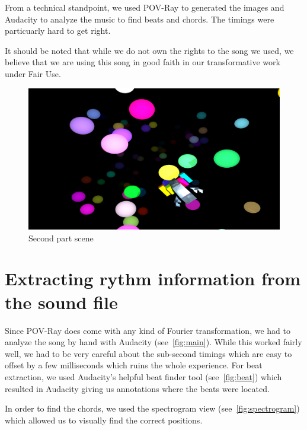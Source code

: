 \documentclass[a4paper, 12pt]{scrartcl}
\begin{document}
    From a technical standpoint, we used POV-Ray to generated the images and Audacity to analyze
    the music to find beats and chords. The timings were particuarly hard to get right.

    It should be noted that while we do not own the rights to the song we used, we believe that we
    are using this song in good faith in our transformative work under Fair Use.

    \begin{figure}[H]
        \centering
        \includegraphics[scale=0.23]{render_part2}
        \caption{Second part scene}
        \label{fig:part2}
    \end{figure}

    \section{Extracting rythm information from the sound file}

    Since POV-Ray does come with any kind of Fourier transformation, we had to analyze the song by
    hand with Audacity (see~\ref{fig:main}). While this worked fairly well, we had to be very
    careful about the sub-second timings which are easy to offset by a few milliseconds which ruins
    the whole experience. For beat extraction, we used Audacity's helpful beat finder tool (see~\ref{fig:beat}) which resulted in Audacity giving us annotations where the beats were located.

    In order to find the chords, we used the spectrogram view (see~\ref{fig:spectrogram}) which
    allowed us to visually find the correct positions.
\end{document}
